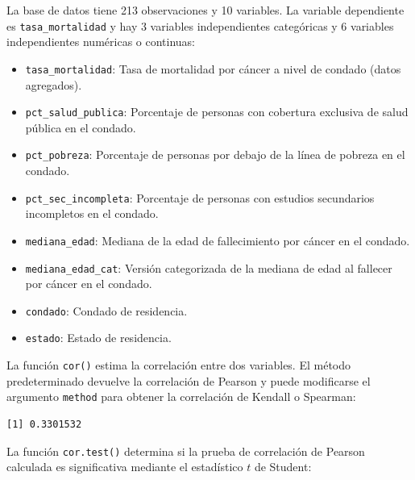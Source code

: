 \documentclass[
  spanish,
  a4paper,
]{scrbook}
\newenvironment{Shaded}{\begin{snugshade}}{\end{snugshade}}
\newcommand{\AttributeTok}[1]{\textcolor[rgb]{0.40,0.45,0.13}{#1}}
\newcommand{\FunctionTok}[1]{\textcolor[rgb]{0.28,0.35,0.67}{#1}}
\newcommand{\NormalTok}[1]{\textcolor[rgb]{0.00,0.23,0.31}{#1}}
\newcommand{\SpecialCharTok}[1]{\textcolor[rgb]{0.37,0.37,0.37}{#1}}
\newcommand{\StringTok}[1]{\textcolor[rgb]{0.13,0.47,0.30}{#1}}
\begin{document}
La base de datos tiene 213 observaciones y 10 variables. La variable
dependiente es \texttt{tasa\_mortalidad} y hay 3 variables
independientes categóricas y 6 variables independientes numéricas o
continuas:

\begin{itemize}
\item
  \texttt{tasa\_mortalidad}: Tasa de mortalidad por cáncer a nivel de
  condado (datos agregados).
\item
  \texttt{pct\_salud\_publica}: Porcentaje de personas con cobertura
  exclusiva de salud pública en el condado.
\item
  \texttt{pct\_pobreza}: Porcentaje de personas por debajo de la línea
  de pobreza en el condado.
\item
  \texttt{pct\_sec\_incompleta}: Porcentaje de personas con estudios
  secundarios incompletos en el condado.
\item
  \texttt{mediana\_edad}: Mediana de la edad de fallecimiento por cáncer
  en el condado.
\item
  \texttt{mediana\_edad\_cat}: Versión categorizada de la mediana de
  edad al fallecer por cáncer en el condado.
\item
  \texttt{condado}: Condado de residencia.
\item
  \texttt{estado}: Estado de residencia.
\end{itemize}

La función \texttt{cor()} estima la correlación entre dos variables. El
método predeterminado devuelve la correlación de Pearson y puede
modificarse el argumento \texttt{method} para obtener la correlación de
Kendall o Spearman:

\begin{Shaded}
\end{Shaded}

\begin{verbatim}
[1] 0.3301532
\end{verbatim}

La función \texttt{cor.test()} determina si la prueba de correlación de
Pearson calculada es significativa mediante el estadístico \(t\) de
Student:

\begin{Shaded}
\end{Shaded}
\end{document}

